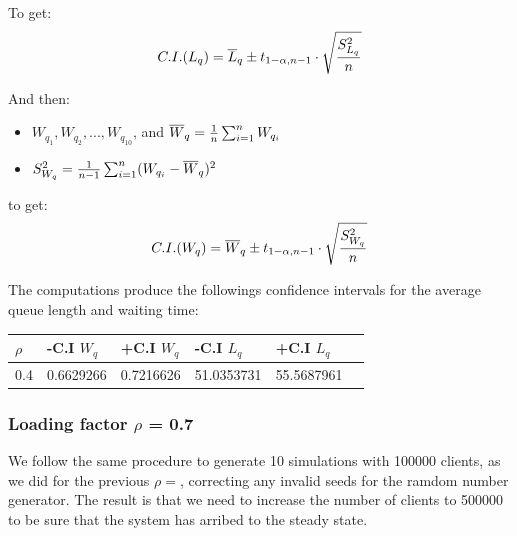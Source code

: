 \documentclass[]{article}
\providecommand{\tightlist}{%
  \setlength{\itemsep}{0pt}\setlength{\parskip}{0pt}}
\begin{document}
To get:
\[C.I.(L_{q}) =   \overline{L}_{q} \pm t_{1 - \alpha, n - 1} \cdot \sqrt{S_{L_{q}}^{2} \over n}\]

And then:

\begin{itemize}
\tightlist
\item
  \(W_{q_{1}},W_{q_{2}},...,W_{q_{10}}\), and
  \(\overline{W}_{q} = {1 \over n}\sum_{i=1}^{n}W_{q_{i}}\)
\item
  \(S_{W_{q}}^{2} = {1 \over n - 1} \sum_{i=1}^{n} ( W_{q_{i}} - \overline{W}_{q} )^{2}\)
\end{itemize}

to get:
\[ C.I.(W_{q}) =   \overline{W}_{q} \pm t_{1 - \alpha, n - 1} \cdot \sqrt{S_{W_{q}}^{2} \over n}\]

The computations produce the followings confidence intervals for the
average queue length and waiting time:

\begin{longtable}[]{@{}llllll@{}}
\toprule
\(\rho\) & -C.I \(W_{q}\) & +C.I \(W_{q}\) & -C.I \(L_{q}\) & +C.I
\(L_{q}\) &\tabularnewline
\midrule
\endhead
0.4 & 0.6629266 & 0.7216626 & 51.0353731 & 55.5687961\tabularnewline
\bottomrule
\end{longtable}

\subsubsection{\texorpdfstring{Loading factor \(\rho\) =
0.7}{Loading factor \textbackslash{}rho = 0.7}}\label{loading-factor-rho-0.7}

We follow the same procedure to generate 10 simulations with 100000
clients, as we did for the previous \(\rho=\), correcting any invalid
seeds for the ramdom number generator. The result is that we need to
increase the number of clients to 500000 to be sure that the system has
arribed to the steady state.

\end{document}
